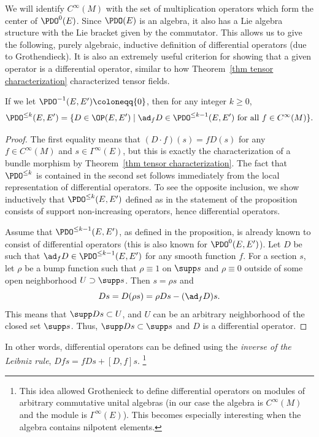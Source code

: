 We will identify $C^\infty(M)$ with the set of multiplication operators which form the center of $\PDO^0(E)$. Since $\PDO(E)$ is an algebra, it also has a Lie algebra structure with the Lie bracket given by the commutator.
This allows us to give the following, purely algebraic, inductive definition of differential operators (due to Grothendieck). It is also an extremely useful criterion for showing that a given operator is a differential operator, similar to how Theorem~\ref{thm tensor characterization} characterized tensor fields.

\begin{prop}
    If we let $\PDO^{-1}(E,E')\coloneqq \{0\}$, then for any integer $k\geq 0$,
    \[\PDO^{\leq k}(E,E')=\{D\in\OP(E,E')\mid \ad_f D\in\PDO^{\leq k-1}(E,E')\text{ for all }f\in C^\infty(M)\}.\]
\end{prop}
\begin{proof}
    The first equality means that $(D\cdot f)(s)=f D(s)$ for any $f\in C^\infty(M)$ and $s\in\Gamma^\infty(E)$, but this is exactly the characterization of a bundle morphism by Theorem~\ref{thm tensor characterization}. The fact that $\PDO^{\leq k}$ is contained in the second set follows immediately from the local representation of differential operators. To see the opposite inclusion, we show inductively that $\PDO^{\leq k}(E,E')$ defined as in the statement of the proposition consists of support non-increasing operators, hence differential operators.

    Assume that $\PDO^{\leq k-1}(E,E')$, as defined in the proposition, is already known to consist of differential operators (this is also known for $\PDO^0(E,E')$). Let $D$ be such that $\ad_fD\in\PDO^{\leq k-1}(E,E')$ for any smooth function $f$. For a section $s$, let $\rho$ be a bump function such that $\rho\equiv 1$ on $\supp s$ and $\rho\equiv 0$ outside of some open neighborhood $U\supset \supp s$. Then $s=\rho s$ and 
    \[Ds=D(\rho s)=\rho Ds-(\ad_f D)s.\]
    This means that $\supp Ds\subset U$, and $U$ can be an arbitrary neighborhood of the closed set $\supp s$. Thus, $\supp Ds\subset \supp s$ and $D$ is a differential operator.
\end{proof}

In other words, differential operators can be defined using the \emph{inverse of the Leibniz rule}, $Dfs=fDs+[D,f]s$. \footnote{This idea allowed Grothenieck to define differential operators on modules of arbitrary commutative unital algebras (in our case the algebra is $C^\infty(M)$ and the module is $\Gamma^\infty(E)$). This becomes especially interesting when the algebra contains nilpotent elements.}

